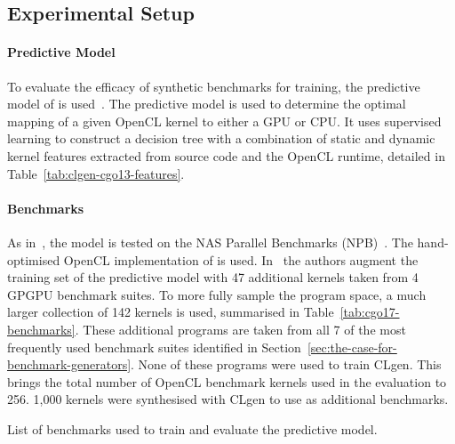 \subsection{Experimental Setup}


\paragraph*{Predictive Model}

To evaluate the efficacy of synthetic benchmarks for training, the predictive model of \citeauthor{Grewe2013} is used~\cite{Grewe2013}. The predictive model is used to determine the optimal mapping of a given OpenCL kernel to either a GPU or CPU. It uses supervised learning to construct a decision tree with a combination of static and dynamic kernel features extracted from source code and the OpenCL runtime, detailed in Table~\ref{tab:clgen-cgo13-features}.

\begin{table}
  \centering%
  \caption[\citeauthor{Grewe2013} features for heterogeneous device mapping]{%
    Features used by \citeauthor{Grewe2013} to predict CPU/GPU mapping of OpenCL kernels. The features are extracted using a custom analysis pass built using LLVM.
  }%
  \label{tab:clgen-cgo13-features} %
\end{table}


\paragraph*{Benchmarks}

As in~\cite{Grewe2013}, the model is tested on the NAS Parallel Benchmarks (NPB)~\cite{Bailey1991a}. The hand-optimised OpenCL implementation of \citeauthor{Seo2011} \cite{Seo2011} is used. In~\cite{Grewe2013} the authors augment the training set of the predictive model with 47 additional kernels taken from 4 GPGPU benchmark suites. To more fully sample the program space, a much larger collection of 142 kernels is used, summarised in Table~\ref{tab:cgo17-benchmarks}. These additional programs are taken from all 7 of the most frequently used benchmark suites identified in Section~\ref{sec:the-case-for-benchmark-generators}. None of these programs were used to train CLgen. This brings the total number of OpenCL benchmark kernels used in the evaluation to 256. 1,000 kernels were synthesised with CLgen to use as additional benchmarks.

\begin{table}
  \centering%
  
  \caption[Benchmarks used in evaluation]{List of benchmarks used to train and evaluate the \citeauthor{Grewe2013} predictive model.} %
  \label{tab:cgo17-benchmarks} %
\end{table}


